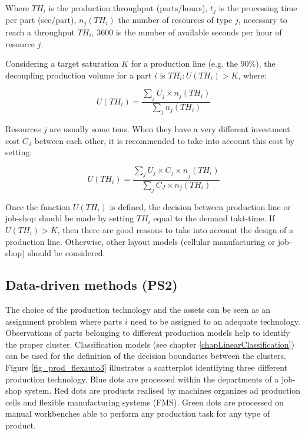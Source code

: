 Where $TH_i$ is the production throughput (parts/hours), $t_j$ is the processing time per part (sec/part), $n_j(TH_i)$ the number of resources of type $j$, necessary to reach a throughput $TH_i$, 3600 is the number of available seconds per hour of resource $j$.\par

Considering a target saturation $K$ for a production line (e.g. the 90\%), the decoupling production volume for a part $i$ is $TH_i:U(TH_i)>K$, where:

\begin{equation}
    U(TH_i)=\frac{\sum_{j}{U_j\times n_j(TH_i)}}{\sum_{j}{n_j(TH_i)}}
\end{equation}

Resources $j$ are usually some tens. When they have a very different investment cost $C_J$ between each other, it is recommended to take into account this cost by setting:

\begin{equation}
    U(TH_i)=\frac{\sum_{j}{U_j\times{C_j\times n}_j(TH_i)}}{\sum_{j}{C_J\times n_j(TH_i)}}
\end{equation}

Once the function $U(TH_i)$ is defined, the decision between production line or job-shop should be made by setting $TH_i$ equal to the demand takt-time. If $U\left(TH_i\right)>K$, then there are good reasons to take into account the design of a production line. Otherwise, other layout models (cellular manufacturing or job-shop) should be considered.

\subsection{Data-driven methods (PS2)}

The choice of the production technology and the assets can be seen as an assignment problem where parts $i$ need to be assigned to an adequate technology. Observations of parts belonging to different production models help to identify the proper cluster. Classification models (see chapter \ref{chapLinearClassification}) can be used for the definition of the decision boundaries between the clusters. Figure \ref{fig_prod_flexauto3} illustrates a scatterplot identifying three different production technology. Blue dots are processed within the departments of a job-shop system. Red dots are products realised by machines organizes ad production cells and flexible manufacturing systems (FMS). Green dots are processed on manual workbenches able to perform any production task for any type of product.

